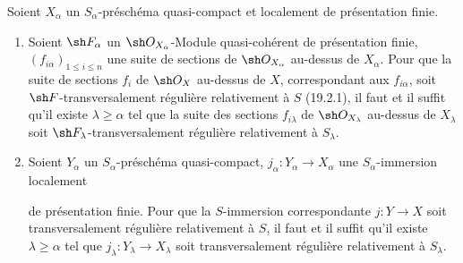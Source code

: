 \begin{proposition}[19.8.2]
\label{IV.19.8.2}
Soient $X_\alpha$ un $S_\alpha$-préschéma quasi-compact et localement de présentation finie.
\begin{enumerate}
  \item[(i)] Soient $\sh F_\alpha$ un $\sh O_{X_\alpha}$-Module quasi-cohérent de présentation finie, $(f_{i\alpha})_{1\leq i\leq n}$ une suite de sections de $\sh O_{X_\alpha}$ au-dessus de $X_\alpha$. Pour que la suite de sections $f_i$ de $\sh O_X$ au-dessus de $X$, correspondant aux $f_{i\alpha}$, soit $\sh F$-transversalement régulière relativement à $S$ (19.2.1), il faut et il suffit qu'il existe $\lambda\geq\alpha$ tel que la suite des sections $f_{i\lambda}$ de $\sh O_{X_\lambda}$ au-dessus de $X_\lambda$ soit $\sh F_\lambda$-transversalement régulière relativement à $S_\lambda$.
  \item[(ii)] Soient $Y_\alpha$ un $S_\alpha$-préschéma quasi-compact, $j_\alpha:Y_\alpha\to X_\alpha$ une $S_\alpha$-immersion localement


  de présentation finie. Pour que la $S$-immersion correspondante $j:Y\to X$ soit transversalement régulière relativement à $S$, il faut et il suffit qu'il existe $\lambda\geq\alpha$ tel que $j_\lambda:Y_\lambda\to X_\lambda$ soit transversalement régulière relativement à $S_\lambda$.
\end{enumerate}
\end{proposition}

